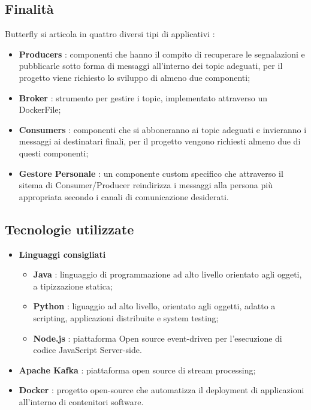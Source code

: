         \subsection{Finalità}
            Butterfly si articola in quattro diversi tipi di applicativi :
            \begin{itemize}
                \item \textbf{Producers} : componenti che hanno il compito di recuperare le segnalazioni e pubblicarle sotto forma di messaggi all'interno dei topic adeguati, per il progetto viene richiesto lo sviluppo di almeno due componenti;
                \item \textbf{Broker} : strumento per gestire i topic, implementato attraverso un DockerFile;
                \item \textbf{Consumers} : componenti che si abboneranno ai topic adeguati e invieranno i messaggi ai destinatari finali, per il progetto vengono richiesti almeno due di questi componenti;
                \item \textbf{Gestore Personale} : un componente custom specifico che attraverso il sitema di Consumer/Producer reindirizza i messaggi alla persona più appropriata secondo i canali di comunicazione desiderati.
        \end{itemize}
        \subsection{Tecnologie utilizzate}
            \begin{itemize}
                \item \textbf{Linguaggi consigliati}
                    \begin{itemize}
                        \item \textbf{Java} : linguaggio di programmazione ad alto livello orientato agli oggeti, a tipizzazione statica;
                        \item \textbf{Python} : liguaggio ad alto livello, orientato agli oggetti, adatto a scripting, applicazioni distribuite e system testing;
                        \item \textbf{Node.js} : piattaforma Open source event-driven per l'esecuzione di codice JavaScript Server-side.
                    \end{itemize}	
            \item \textbf{Apache Kafka} : piattaforma open source di stream processing;
            \item \textbf{Docker} : progetto open-source che automatizza il deployment di applicazioni all'interno di contenitori software.
            \end{itemize}
